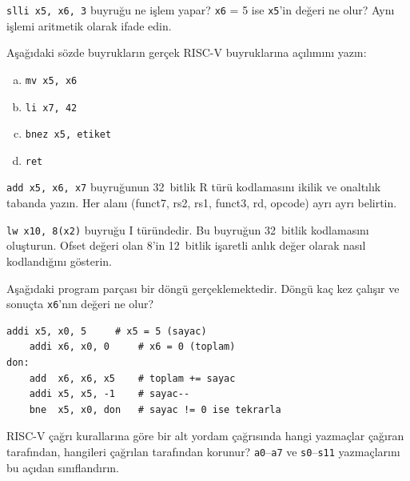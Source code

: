 \begin{alistirma}[\kolay]
\texttt{slli x5, x6, 3} buyruğu ne işlem yapar? \texttt{x6} = 5 ise \texttt{x5}'in değeri ne olur? Aynı işlemi aritmetik olarak ifade edin.
\end{alistirma}

\begin{alistirma}[\kolay]
Aşağıdaki sözde buyrukların gerçek RISC-V buyruklarına açılımını yazın:
\begin{enumerate}[(a)]
    \item \texttt{mv x5, x6}
    \item \texttt{li x7, 42}
    \item \texttt{bnez x5, etiket}
    \item \texttt{ret}
\end{enumerate}
\end{alistirma}

\begin{alistirma}[\orta]
\texttt{add x5, x6, x7} buyruğunun 32~bitlik R türü kodlamasını ikilik ve onaltılık tabanda yazın. Her alanı (funct7, rs2, rs1, funct3, rd, opcode) ayrı ayrı belirtin.
\end{alistirma}

\begin{alistirma}[\orta]
\texttt{lw x10, 8(x2)} buyruğu I türündedir. Bu buyruğun 32~bitlik kodlamasını oluşturun. Ofset değeri olan 8'in 12~bitlik işaretli anlık değer olarak nasıl kodlandığını gösterin.
\end{alistirma}

\begin{alistirma}[\orta]
Aşağıdaki program parçası bir döngü gerçeklemektedir. Döngü kaç kez çalışır ve sonuçta \texttt{x6}'nın değeri ne olur?
\begin{lstlisting}[style=riscv, style=alistirma-kod]
    addi x5, x0, 5     # x5 = 5 (sayac)
    addi x6, x0, 0     # x6 = 0 (toplam)
don:
    add  x6, x6, x5    # toplam += sayac
    addi x5, x5, -1    # sayac--
    bne  x5, x0, don   # sayac != 0 ise tekrarla
\end{lstlisting}
\end{alistirma}

\begin{alistirma}[\orta]
RISC-V çağrı kurallarına göre bir alt yordam çağrısında hangi yazmaçlar çağıran tarafından, hangileri çağrılan tarafından korunur? \texttt{a0}--\texttt{a7} ve \texttt{s0}--\texttt{s11} yazmaçlarını bu açıdan sınıflandırın.
\end{alistirma}

